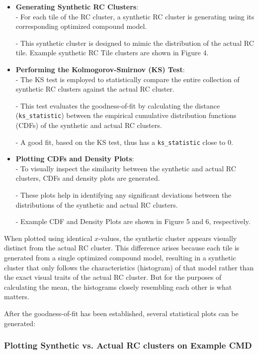 \documentclass[svgnames]{article}     %
\begin{document}
\begin{itemize}
  \item[1.] \textbf{Generating Synthetic RC Clusters}: \\
    - For each tile of the RC cluster, a synthetic RC cluster is generating
    using its corresponding optimized compound model. 
    
    - This synthetic cluster is designed to mimic the distribution of the
    actual RC tile. Example synthetic RC Tile clusters are shown in Figure 4. 
\item[2.] \textbf{Performing the Kolmogorov-Smirnov (KS) Test}: \\
    - The KS test is employed to statistically compare the entire collection of
    synthetic RC clusters against the actual RC cluster. 
    
    - This test evaluates the goodness-of-fit by calculating the distance
    (\verb|ks_statistic|)
    between the empirical
    cumulative distribution functions (CDFs) of the synthetic and actual RC
    clusters. 

    - A good fit, based on the KS test, thus has a \verb|ks_statistic| close to
    0. 
 \item[3.] \textbf{Plotting CDFs and Density Plots}: \\
   - To visually inspect the similarity between the synthetic and actual RC
   clusters, CDFs and density plots are generated. 

   - These plots help in identifying any significant deviations between the
   distributions of the synthetic and actual RC clusters. 

   - Example CDF and Density Plots are shown in Figure 5 and 6, respectively. 
\end{itemize}

When plotted using identical $x$-values, the synthetic cluster appears visually
distinct from the actual RC cluster. This difference arises because each tile
is generated from a single optimized compound model, resulting in a synthetic
cluster that only follows the characteristics (histogram) of that model rather than the
exact visual traits of the actual RC cluster. But for the purposes of
calculating the mean, the histograms closely resembling each other is what
matters. 

After the goodness-of-fit has been established, several statistical plots can
be generated: 

\subsubsection{Plotting Synthetic vs. Actual RC clusters on Example CMD} 
\end{document}
